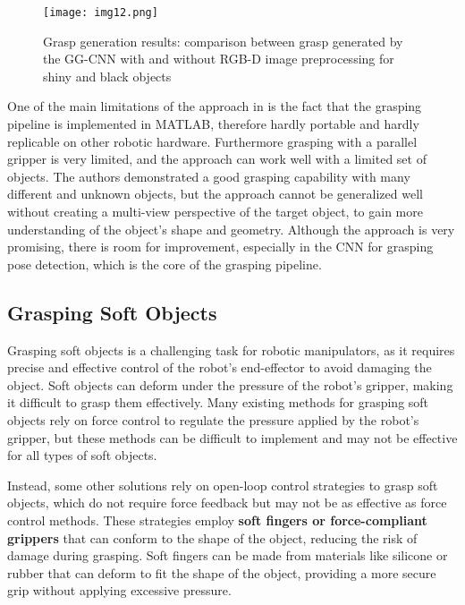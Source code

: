 \begin{figure}[ht]
	\centering
	\texttt{[image: img12.png]}
	\captionsetup{width=1\linewidth}
	\caption{Grasp generation results: comparison between grasp generated by the GG-CNN
		with and without RGB-D image preprocessing for shiny and black objects
		\cite{sayour2022unknowngrasping}}
	\label{fig:img12}
\end{figure}

One of the main limitations of the approach in \cite{sayour2022unknowngrasping} is the fact
that the grasping pipeline is implemented in MATLAB, therefore hardly portable and hardly
replicable on other robotic hardware. Furthermore grasping with a parallel gripper is
very limited, and the approach can work well with a limited set of objects. The authors
demonstrated a good grasping capability with many different and unknown objects, but
the approach cannot be generalized well without creating a multi-view perspective of
the target object, to gain more understanding of the object's shape and
geometry. Although the approach is very promising, there is room for improvement,
especially in the CNN for grasping pose detection, which is the core of the grasping pipeline.


\subsection{Grasping Soft Objects}

Grasping soft objects is a challenging task for robotic manipulators, as it requires
precise and effective control of the robot's end-effector to avoid damaging the object.
Soft objects can deform under the pressure of the robot's gripper, making it difficult
to grasp them effectively. Many existing methods for grasping soft objects rely on
force control to regulate the pressure applied by the robot's gripper, but these methods
can be difficult to implement and may not be effective for all types of soft objects.

Instead, some other solutions rely on open-loop control strategies to grasp soft objects,
which do not require force feedback but may not be as effective as force control methods.
These strategies employ \textbf{soft fingers or force-compliant grippers} that can conform to the shape
of the object, reducing the risk of damage during grasping. Soft fingers can be made
from materials like silicone or rubber that can deform to fit the shape of the object,
providing a more secure grip without applying excessive pressure.

